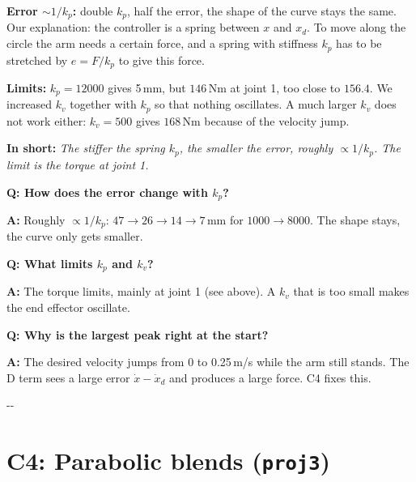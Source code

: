 \documentclass[10pt,a4paper]{article}
\makeatletter
\newcommand{\secneed}[1]{\par\penalty\@M\begingroup\setlength{\dimen@}{#1}\dimen@ii\pagegoal
  \advance\dimen@ii-\pagetotal\ifdim\dimen@>\dimen@ii\ifdim\dimen@ii>\z@\vfil\fi\penalty-\@M\fi\endgroup}
\let\oldsection\section
\renewcommand{\section}{\secneed{9\baselineskip}\oldsection}
\newcommand{\frage}[2]{\textbf{Q: #1}\par\nopagebreak\vspace{1pt}\textbf{A:} #2\par\vspace{5pt}}
\newcommand{\sagen}[1]{\textbf{In short:} \emph{#1}\par}
\newcommand{\code}[1]{\texttt{#1}}
\makeatother
\begin{document}
\textbf{Error $\sim 1/k_p$:} double $k_p$, half the error, the shape of the curve stays the same. Our explanation: the
controller is a spring between $x$ and $x_d$. To move along the circle the arm needs a certain force, and a spring with
stiffness $k_p$ has to be stretched by $e = F/k_p$ to give this force.

\textbf{Limits:} $k_p = 12000$ gives 5\,mm, but $146$\,Nm at joint 1, too close to $156.4$. We increased $k_v$ together
with $k_p$ so that nothing oscillates. A much larger $k_v$ does not work either: $k_v = 500$ gives $168$\,Nm because of
the velocity jump.

\sagen{The stiffer the spring $k_p$, the smaller the error, roughly $\propto 1/k_p$. The limit is the torque at joint 1.}

\begin{fragen}
\frage{How does the error change with $k_p$?}
{Roughly $\propto 1/k_p$: $47 \to 26 \to 14 \to 7$\,mm for $1000 \to 8000$. The shape stays, the curve only gets
smaller.}
\frage{What limits $k_p$ and $k_v$?}
{The torque limits, mainly at joint 1 (see above). A $k_v$ that is too small makes the end effector oscillate.}
\frage{Why is the largest peak right at the start?}
{The desired velocity jumps from 0 to 0.25\,m/s while the arm still stands. The D term sees a large error
$\dot x - \dot x_d$ and produces a large force. C4 fixes this.}
\end{fragen}

\section{C4: Parabolic blends (\code{proj3})}
\end{document}
